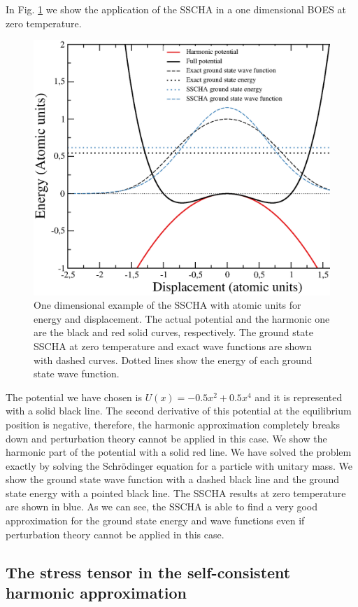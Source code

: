 In Fig. \ref{1dimsscha} we show the application of the SSCHA in a one dimensional BOES at zero temperature.
\begin{figure}[h]
\begin{center}
\includegraphics[width=0.8\linewidth]{Figures/result.eps}
\caption[One dimensional example of the SSCHA]{One dimensional example of the SSCHA with atomic units for energy and displacement. The actual potential and the harmonic one are the black and red solid curves, respectively. The ground 
state SSCHA at zero temperature and exact wave functions are shown with dashed curves. Dotted lines show the energy of each ground state wave function.}
\label{1dimsscha}
\end{center}
\end{figure}
The potential we have chosen is $U(x)=-0.5x^{2}+0.5x^{4}$ and it is represented with a solid black line. The second derivative of this potential at the equilibrium position is negative, therefore, the harmonic approximation 
completely breaks down and perturbation theory cannot be applied in this case. We show the harmonic part of the potential with a solid red line. We have solved the problem exactly by solving the Schr\"odinger equation for 
a particle with unitary mass. We show the ground state wave function with a dashed black line and the ground state energy with a pointed black line. The SSCHA results at zero temperature are shown in blue. As we can 
see, the SSCHA is able to find a very good approximation for the ground state energy and wave functions even if perturbation theory cannot be applied in this case.  

\subsection{The stress tensor in the self-consistent harmonic approximation}
\label{scha-stress-section}

